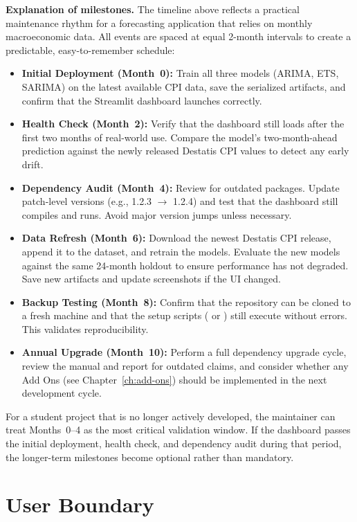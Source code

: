 \textbf{Explanation of milestones.} The timeline above reflects a practical maintenance rhythm for a forecasting application that relies on monthly macroeconomic data. All events are spaced at equal 2-month intervals to create a predictable, easy-to-remember schedule:

\begin{itemize}
    \item \textbf{Initial Deployment (Month~0):} Train all three models (ARIMA, ETS, SARIMA) on the latest available CPI data, save the serialized artifacts, and confirm that the Streamlit dashboard launches correctly.
    \item \textbf{Health Check (Month~2):} Verify that the dashboard still loads after the first two months of real-world use. Compare the model's two-month-ahead prediction against the newly released Destatis CPI values to detect any early drift.
    \item \textbf{Dependency Audit (Month~4):} Review  for outdated packages. Update patch-level versions (e.g., 1.2.3 $\rightarrow$ 1.2.4) and test that the dashboard still compiles and runs. Avoid major version jumps unless necessary.
    \item \textbf{Data Refresh (Month~6):} Download the newest Destatis CPI release, append it to the dataset, and retrain the models. Evaluate the new models against the same 24-month holdout to ensure performance has not degraded. Save new artifacts and update screenshots if the UI changed.
    \item \textbf{Backup Testing (Month~8):} Confirm that the repository can be cloned to a fresh machine and that the setup scripts ( or ) still execute without errors. This validates reproducibility.
    \item \textbf{Annual Upgrade (Month~10):} Perform a full dependency upgrade cycle, review the manual and report for outdated claims, and consider whether any Add Ons (see Chapter~\ref{ch:add-ons}) should be implemented in the next development cycle.
\end{itemize}

For a student project that is no longer actively developed, the maintainer can treat Months~0--4 as the most critical validation window. If the dashboard passes the initial deployment, health check, and dependency audit during that period, the longer-term milestones become optional rather than mandatory.

\section{User Boundary}

